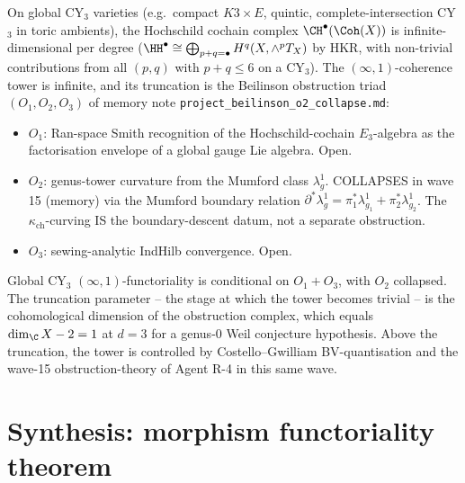 \begin{remark}
\label{rem:obstruction-tower-global-cy3}
On global CY$_3$ varieties (e.g.\ compact $K3 \times E$, quintic,
complete-intersection CY$_3$ in toric ambients), the Hochschild cochain
complex $\CH^\bullet(\Coh(X))$ is infinite-dimensional per degree
($\HH^\bullet \cong \bigoplus_{p+q = \bullet} H^q(X, \wedge^p T_X)$ by
HKR, with non-trivial contributions from all $(p,q)$ with $p + q \leq 6$
on a CY$_3$).  The $(\infty,1)$-coherence tower is infinite, and its
truncation is the Beilinson obstruction triad $(O_1, O_2, O_3)$ of
memory note \texttt{project\_beilinson\_o2\_collapse.md}:
\begin{itemize}
 \item $O_1$: Ran-space Smith recognition of the Hochschild-cochain
       $E_3$-algebra as the factorisation envelope of a global gauge
       Lie algebra.  Open.
 \item $O_2$: genus-tower curvature from the Mumford class
       $\lambda_g^1$.  COLLAPSES in wave 15 (memory) via the Mumford
       boundary relation $\partial^* \lambda_g^1 = \pi_1^* \lambda_{g_1}^1 +
       \pi_2^* \lambda_{g_2}^1$.  The $\kappa_{\mathrm{ch}}$-curving IS
       the boundary-descent datum, not a separate obstruction.
 \item $O_3$: sewing-analytic IndHilb convergence.  Open.
\end{itemize}
Global CY$_3$ $(\infty,1)$-functoriality is conditional on $O_1 + O_3$,
with $O_2$ collapsed.  The truncation parameter -- the stage at which
the tower becomes trivial -- is the cohomological dimension of the
obstruction complex, which equals $\dim_{\C} X - 2 = 1$ at $d = 3$ for
a genus-$0$ Weil conjecture hypothesis.  Above the truncation, the
tower is controlled by Costello--Gwilliam BV-quantisation and the
wave-15 obstruction-theory of Agent R-4 in this same wave.
\end{remark}


\section*{Synthesis: morphism functoriality theorem}

